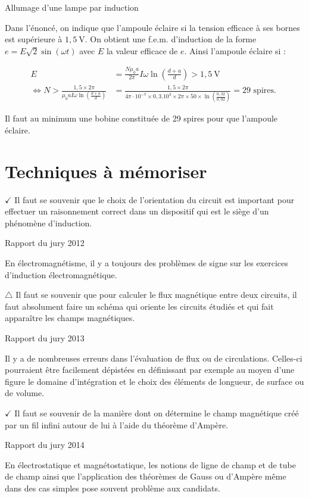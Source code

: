\begin{exo}[PC][1][oral]{Allumage d'une lampe par induction}
{Dans l'énoncé, on indique que l'ampoule éclaire si la tension efficace à ses bornes est supérieure à $1,5 \mathrm{~V}$. On obtient une f.e.m. d'induction de la forme $e=E \sqrt{2} \sin (\omega t)$ avec $E$ la valeur efficace de $e$. Ainsi l'ampoule éclaire si :

$$
\begin{aligned}
E & =\frac{N \mu_{0} a}{2 \pi} I \omega \ln \left(\frac{d+a}{d}\right)>1,5 \mathrm{~V} \\
\Leftrightarrow N>\frac{1,5 \times 2 \pi}{\mu_{0} a I \omega \ln \left(\frac{d+a}{d}\right)} & =\frac{1,5 \times 2 \pi}{4 \pi \cdot 10^{-7} \times 0,3.10^{3} \times 2 \pi \times 50 \times \ln \left(\frac{0,32}{0,02}\right)}=29 \text { spires. }
\end{aligned}
$$

Il faut au minimum une bobine constituée de 29 spires pour que l'ampoule éclaire.

\section*{Techniques à mémoriser}
$\checkmark$ Il faut se souvenir que le choix de l'orientation du circuit est important pour effectuer un raisonnement correct dans un dispositif qui est le siège d'un phénomène d'induction.

Rapport du jury 2012

En électromagnétisme, il y a toujours des problèmes de signe sur les exercices d'induction électromagnétique.

$\triangle$ Il faut se souvenir que pour calculer le flux magnétique entre deux circuits, il faut absolument faire un schéma qui oriente les circuits étudiés et qui fait apparaître les champs magnétiques.

Rapport du jury 2013

Il y a de nombreuses erreurs dans l'évaluation de flux ou de circulations. Celles-ci pourraient être facilement dépistées en définissant par exemple au moyen d'une figure le domaine d'intégration et le choix des éléments de longueur, de surface ou de volume.

$\checkmark$ Il faut se souvenir de la manière dont on détermine le champ magnétique créé par un fil infini autour de lui à l'aide du théorème d'Ampère.

Rapport du jury 2014

En électrostatique et magnétostatique, les notions de ligne de champ et de tube de champ ainsi que l'application des théorèmes de Gauss ou d'Ampère même dans des cas simples pose souvent problème aux candidats.

}
\end{exo}
